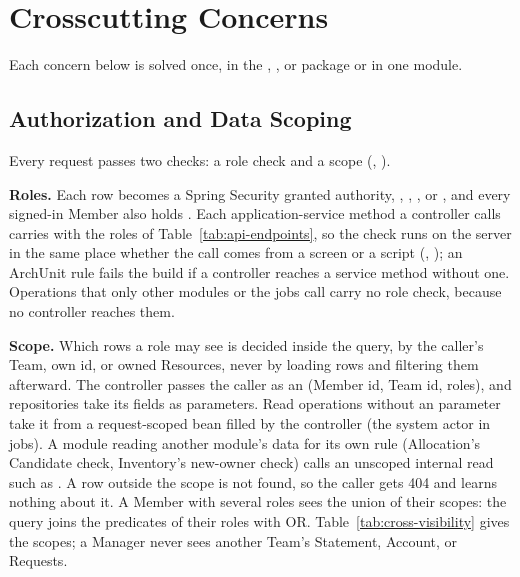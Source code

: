 \section{Crosscutting Concerns}\label{sec:cross}

Each concern below is solved once, in the , , or  package or in one module.

\subsection{Authorization and Data Scoping}

Every request passes two checks: a role check and a scope (, ).

\textbf{Roles.} Each  row becomes a Spring Security granted authority, , , , or , and every signed-in Member also holds . Each application-service method a controller calls carries  with the roles of Table~\ref{tab:api-endpoints}, so the check runs on the server in the same place whether the call comes from a screen or a script (, ); an ArchUnit rule fails the build if a controller reaches a service method without one. Operations that only other modules or the jobs call carry no role check, because no controller reaches them.

\textbf{Scope.} Which rows a role may see is decided inside the query, by the caller's Team, own id, or owned Resources, never by loading rows and filtering them afterward. The controller passes the caller as an  (Member id, Team id, roles), and repositories take its fields as parameters. Read operations without an  parameter take it from a request-scoped  bean filled by the controller (the system actor in jobs). A module reading another module's data for its own rule (Allocation's Candidate check, Inventory's new-owner check) calls an unscoped internal read such as . A row outside the scope is not found, so the caller gets 404 and learns nothing about it. A Member with several roles sees the union of their scopes: the query joins the predicates of their roles with OR. Table~\ref{tab:cross-visibility} gives the scopes; a Manager never sees another Team's Statement, Account, or Requests.

